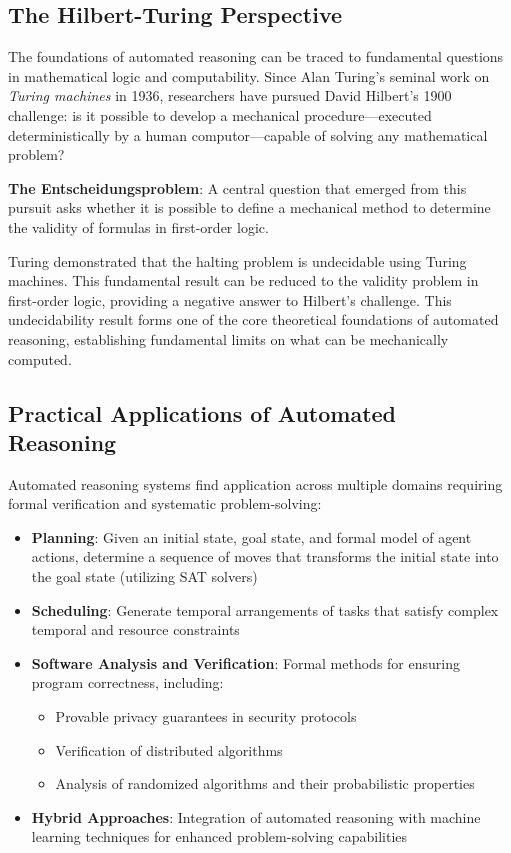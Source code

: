 \documentclass[11pt,a4paper]{article}
\theoremstyle{definition}
\theoremstyle{plain}
\theoremstyle{remark}
\begin{document}
\subsection{The Hilbert-Turing Perspective}

The foundations of automated reasoning can be traced to fundamental questions in mathematical logic and computability. Since Alan Turing's seminal work on \textit{Turing machines} in 1936, researchers have pursued David Hilbert's 1900 challenge: is it possible to develop a mechanical procedure---executed deterministically by a human computor---capable of solving any mathematical problem?

\textbf{The Entscheidungsproblem}: A central question that emerged from this pursuit asks whether it is possible to define a mechanical method to determine the validity of formulas in first-order logic.

Turing demonstrated that the halting problem is undecidable using Turing machines. This fundamental result can be reduced to the validity problem in first-order logic, providing a negative answer to Hilbert's challenge. This undecidability result forms one of the core theoretical foundations of automated reasoning, establishing fundamental limits on what can be mechanically computed.

\subsection{Practical Applications of Automated Reasoning}

Automated reasoning systems find application across multiple domains requiring formal verification and systematic problem-solving:

\begin{itemize}
    \item \textbf{Planning}: Given an initial state, goal state, and formal model of agent actions, determine a sequence of moves that transforms the initial state into the goal state (utilizing SAT solvers)
    \item \textbf{Scheduling}: Generate temporal arrangements of tasks that satisfy complex temporal and resource constraints
    \item \textbf{Software Analysis and Verification}: Formal methods for ensuring program correctness, including:
        \begin{itemize}
            \item Provable privacy guarantees in security protocols
            \item Verification of distributed algorithms
            \item Analysis of randomized algorithms and their probabilistic properties
        \end{itemize}
    \item \textbf{Hybrid Approaches}: Integration of automated reasoning with machine learning techniques for enhanced problem-solving capabilities
\end{itemize}
\end{document}
